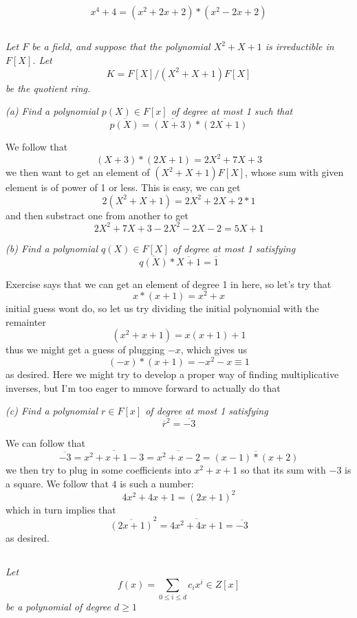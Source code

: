 \documentclass[11pt,oneside,titlepage]{book}
\begin{document}
$$x^4 + 4 = (x^2 + 2x + 2) * (x^2 - 2x + 2)$$

\subsection{}

\textit{Let $F$ be a field, and suppose that the polynomial $X^2 + X
  + 1$ is irreductible in $F[X]$. Let
  $$K = F[X] / (X^2 + X + 1)F[X]$$
  be the quotient ring.}

\textit{(a) Find a polynomial $p(X) \in F[x]$ of degree at most 1 such that
  $$\overline{p(X)} = \overline{(X + 3)} * \overline{(2X + 1)}$$
}

We follow that
$$(X + 3) * (2X + 1) = 2X^2 + 7X + 3$$
we then want to get an element of $(X^2 + X + 1)F[X]$,
whose sum with given element is of power of 1 or less. This is easy,
we can get
$$2(X^2 + X + 1) = 2X^2 + 2X + 2 * 1$$
and then substract one from another to get
$$2X^2 + 7X + 3 - 2X^2 - 2X - 2 = 5X + 1$$

\textit{(b) Find a polynomial $q(X) \in F[X]$ of degree at most 1 satisfying
  $$\overline{q(X)} * \overline{X + 1} = \overline{1}$$
}

Exercise says that we can get an element of degree 1 in here, so let's
try that
$$x * (x + 1) = x^2  + x$$
initial guess wont do, so let us try dividing the initial polynomial
with the remainter
$$(x^2 + x + 1) = x(x + 1) + 1$$
thus we might get a guess of plugging $-x$, which gives us
$$(-x) * (x + 1) = -x^2 - x \equiv 1$$
as desired. Here we might try to develop a proper way of finding
multiplicative inverses, but I'm too eager to mmove forward to
actually do that


\textit{(c) Find a polynomial $r \in F[x]$ of degree at most 1 satisfying
  $$\overline{r}^2 = \overline{- 3}$$
}

We can follow that
$$\overline{- 3} = \overline{x^2 + x + 1 - 3} =
\overline{x^2 + x - 2} = \overline{(x - 1) * (x + 2)}$$
we then try to plug in some coefficients into $x^2 + x + 1$
so that its sum with $-3$ is a square. We follow that
$4$ is such a number:
$$4x^2 + 4x + 1 = (2x + 1)^2$$
which in turn implies that
$$\overline{(2x + 1)}^2 = \overline{4x^2 + 4x + 1} = \overline{-3}$$
as desired.

\subsection{}

\textit{Let
  $$f(x) = \sum_{0 \leq i \leq d}{c_i x^i} \in Z[x]$$
  be a polynomial of degree $d \geq 1$}
\end{document}
